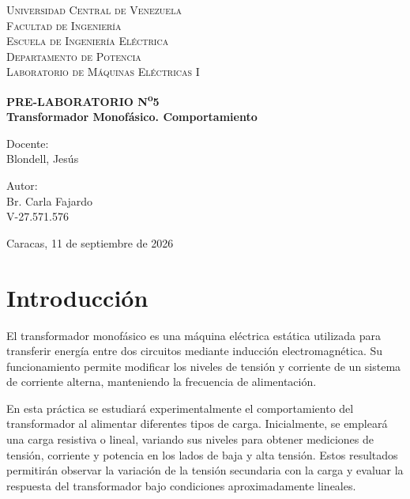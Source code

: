 \documentclass[12pt]{article}
\begin{document}
\thispagestyle{empty}

\begin{center}
    \textsc{Universidad Central de Venezuela}\\[0.35cm]
    \textsc{Facultad de Ingenier\'ia}\\[0.35cm]
    \textsc{Escuela de Ingenier\'ia El\'ectrica}\\[0.35cm]
    \textsc{Departamento de Potencia}\\[0.35cm]
    \textsc{Laboratorio de M\'aquinas El\'ectricas I}
\end{center}

\vspace{6.8cm}

\begin{center}
    \textbf{PRE-LABORATORIO N\textsuperscript{o}5}\\[0.35cm]
    \textbf{Transformador Monof\'asico. Comportamiento}
\end{center}

\vfill

\noindent
\begin{minipage}[t]{0.48\textwidth}
    Docente:\\[0.25cm]
    Blondell, Jes\'us
\end{minipage}%
\hfill
\begin{minipage}[t]{0.48\textwidth}
    \raggedleft
    Autor:\\[0.25cm]
    Br. Carla Fajardo\\[0.25cm]
    V-27.571.576
\end{minipage}

\vspace{1.1cm}

\begin{center}
    Caracas, 11 de septiembre de 2026
\end{center}

\newpage

\section{Introducci\'on}
El transformador monof\'asico es una m\'aquina el\'ectrica est\'atica utilizada para transferir energ\'ia entre dos circuitos mediante inducci\'on electromagn\'etica. Su funcionamiento permite modificar los niveles de tensi\'on y corriente de un sistema de corriente alterna, manteniendo la frecuencia de alimentaci\'on. 

En esta pr\'actica se estudiar\'a experimentalmente el comportamiento del transformador al alimentar diferentes tipos de carga. Inicialmente, se emplear\'a una carga resistiva o lineal, variando sus niveles para obtener mediciones de tensi\'on, corriente y potencia en los lados de baja y alta tensi\'on. Estos resultados permitir\'an observar la variaci\'on de la tensi\'on secundaria con la carga y evaluar la respuesta del transformador bajo condiciones aproximadamente lineales.
\end{document}
